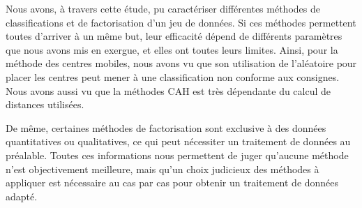 Nous avons, à travers cette étude, pu caractériser différentes méthodes de classifications et de factorisation d'un jeu de données. Si ces méthodes permettent toutes d'arriver à un même but, leur efficacité dépend de différents paramètres que nous avons mis en exergue, et elles ont toutes leurs limites. Ainsi, pour la méthode des centres mobiles,  nous avons vu que son utilisation de l'aléatoire pour placer les centres peut mener à une classification non conforme
aux consignes. Nous avons aussi vu que la méthodes CAH est très dépendante du calcul de distances utilisées.

De même, certaines méthodes de factorisation sont exclusive à des données quantitatives ou qualitatives, ce qui peut nécessiter un traitement de données au préalable. Toutes ces informations nous permettent de juger qu'aucune méthode n'est objectivement meilleure, mais qu'un choix judicieux des méthodes à appliquer est nécessaire au cas par cas pour obtenir un traitement de données adapté.